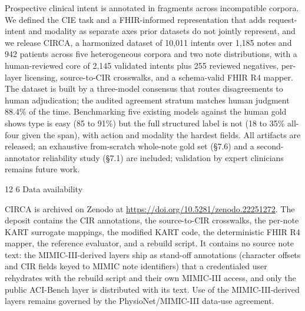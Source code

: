 \documentclass[3p,twocolumn]{elsarticle}
\makeatletter
\renewcommand\section{\@startsection {section}{1}{\z@}%
    {12\p@ \@plus 4\p@ \@minus 4\p@}%
    {6\p@ \@plus 4\p@ \@minus 3\p@}%
    {\normalsize\bfseries\boldmath}}
\makeatother
\begin{document}
Prospective clinical intent is annotated in fragments across incompatible corpora. We defined the CIE task and a FHIR-informed representation that adds request-intent and modality as separate axes prior datasets do not jointly represent, and we release CIRCA, a harmonized dataset of 10,011 intents over 1,185 notes and 942 patients across five heterogeneous corpora and two note distributions, with a human-reviewed core of 2,145 validated intents plus 255 reviewed negatives, per-layer licensing, source-to-CIR crosswalks, and a schema-valid FHIR R4 mapper. The dataset is built by a three-model consensus that routes disagreements to human adjudication; the audited agreement stratum matches human judgment 88.4\% of the time. Benchmarking five existing models against the human gold shows type is easy (85 to 91\%) but the full structured label is not (18 to 35\% all-four given the span), with action and modality the hardest fields. All artifacts are released; an exhaustive from-scratch whole-note gold set (§7.6) and a second-annotator reliability study (§7.1) are included; validation by expert clinicians remains future work.


\section{Data availability}\label{data-availability}

CIRCA is archived on Zenodo at \url{https://doi.org/10.5281/zenodo.22251272}. The deposit contains the CIR annotations, the source-to-CIR crosswalks, the per-note KART surrogate mappings, the modified KART code, the deterministic FHIR R4 mapper, the reference evaluator, and a rebuild script. It contains no source note text: the MIMIC-III-derived layers ship as stand-off annotations (character offsets and CIR fields keyed to MIMIC note identifiers) that a credentialed user rehydrates with the rebuild script and their own MIMIC-III access, and only the public ACI-Bench layer is distributed with its text. Use of the MIMIC-III-derived layers remains governed by the PhysioNet/MIMIC-III data-use agreement.
\end{document}
